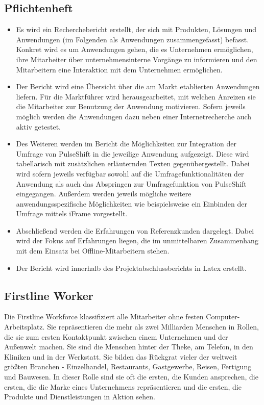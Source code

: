 \subsection{Pflichtenheft}
\begin{itemize}
\item Es wird ein Recherchebericht erstellt, der sich mit Produkten, Lösungen und Anwendungen (im Folgenden als Anwendungen zusammengefasst) befasst. Konkret wird es um Anwendungen gehen, die es Unternehmen ermöglichen, ihre Mitarbeiter über unternehmensinterne Vorgänge zu informieren und den Mitarbeitern eine Interaktion mit dem Unternehmen ermöglichen.
\item Der Bericht wird eine Übersicht über die am Markt etablierten Anwendungen liefern. Für die Marktführer wird herausgearbeitet, mit welchen Anreizen sie die Mitarbeiter zur Benutzung der Anwendung motivieren. Sofern jeweils möglich werden die Anwendungen dazu neben einer Internetrecherche auch aktiv getestet.
\item Des Weiteren werden im Bericht die Möglichkeiten zur Integration der Umfrage von PulseShift in die jeweilige Anwendung aufgezeigt. Diese wird tabellarisch mit zusätzlichen erläuternden Texten gegenübergestellt. Dabei wird sofern jeweils verfügbar sowohl auf die Umfragefunktionalitäten der Anwendung als auch das Abspringen zur Umfragefunktion von PulseShift eingegangen. Außerdem werden jeweils mögliche weitere anwendungsspezifische Möglichkeiten wie beispielsweise ein Einbinden der Umfrage mittels iFrame vorgestellt.
\item Abschließend werden die Erfahrungen von Referenzkunden dargelegt. Dabei wird der Fokus auf Erfahrungen liegen, die im unmittelbaren Zusammenhang mit dem Einsatz bei Offline-Mitarbeitern stehen.
\item Der Bericht wird innerhalb des Projektabschlussberichts in Latex erstellt.
\end{itemize}


\subsection{Firstline Worker}

Die Firstline Workforce klassifiziert alle Mitarbeiter ohne festen Computer-Arbeitsplatz. Sie repräsentieren die mehr als zwei Milliarden Menschen  in Rollen, die sie zum ersten Kontaktpunkt zwischen einem Unternehmen und der Außenwelt machen. Sie sind die Menschen hinter der Theke, am Telefon, in den Kliniken und in der Werkstatt. Sie bilden das Rückgrat vieler der weltweit größten Branchen - Einzelhandel, Restaurants, Gastgewerbe, Reisen, Fertigung und Bauwesen. In dieser Rolle sind sie oft die ersten, die Kunden ansprechen, die ersten, die die Marke eines Unternehmens repräsentieren und die ersten, die Produkte und Dienstleistungen in Aktion sehen.


